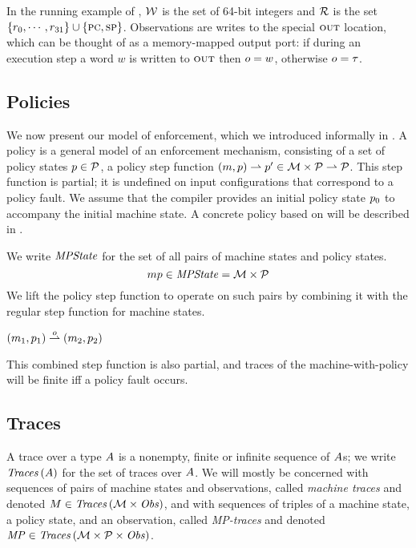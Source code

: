 \documentclass[acmsmall,review,anonymous]{acmart}\settopmatter{printfolios=true,printccs=false,printacmref=false}
\begin{document}
In the running example of ,
${\mathcal W}$ is the
set of 64-bit integers and ${\mathcal R}$ is the set $\{r_0, \cdots, r_{31}\}
\cup \{\textsc{pc},\textsc{sp}\}$. Observations are writes to the
special $\textsc{out}$ location\ifaftersubmission{}\fi, which can be thought of as a memory-mapped
  output port: if during an execution step a word $w$ is
written to $\textsc{out}$ then $o = w$, otherwise $o = \tau$.

\subsection{Policies}

We now present our model of enforcement, which we introduced
informally in .  A policy is a general model of an
enforcement mechanism, consisting of a set of policy states \(p \in
\mathcal{P}\), a policy step function \((m, p) \rightharpoonup p' \in
{\mathcal M} \times \mathcal{P} \rightharpoonup \mathcal{P}\). This step function is partial;
it is undefined on input configurations that correspond to a policy fault.
We assume that the
compiler provides an initial policy state $p_0$ to accompany
the initial machine state.
%
A concrete policy based on \citet{DBLP:conf/sp/RoesslerD18} will be described in
.

We write $\mathit{MPState}$ for the set of all pairs of machine states and policy
states.
%
\[mp \in \mathit{MPState} = {\mathcal M} \times \mathcal{P}\]
%
We lift the policy step function to operate on such pairs
by combining it with the regular step function for machine states.

            {\((m_1,p_1) \overset{o}{\rightharpoonup}
               (m_2,p_2)\)}

This combined step function is also partial, and traces of the machine-with-policy
will be finite iff a policy fault occurs.

\subsection{Traces}
\label{sec:traces}

A trace over a type $A$ is a nonempty, finite or infinite sequence of
$A$s; we write $\mathit{Traces}\,(A)$ for the set of traces over
$A$. We will mostly be concerned with sequences of pairs of
machine states
and observations, called \emph{machine traces} and denoted $M \in \mathit{Traces}\,({\mathcal M} \times \mathit{Obs})$,
and with sequences of triples of a machine state, a policy state, and an
observation, called \emph{MP-traces} and denoted $\mathit{MP} \in \mathit{Traces}\,({\mathcal M} \times \mathcal{P} \times \mathit{Obs})$.
\end{document}

